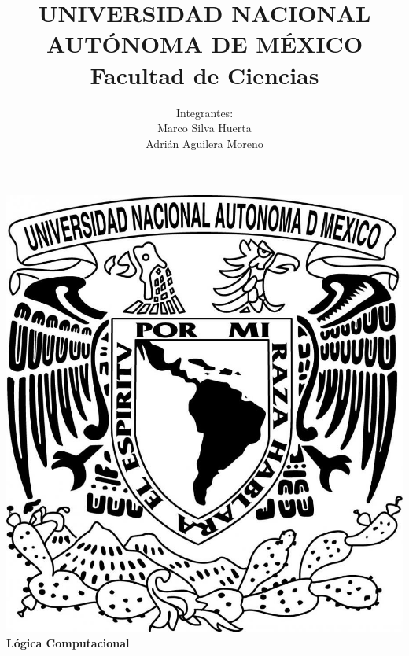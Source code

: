 \documentclass{article}
\begin{document}
\title{UNIVERSIDAD NACIONAL AUT\'ONOMA DE M\'EXICO\\ Facultad de Ciencias}
\author{Integrantes:\\
  Marco Silva Huerta\\
  Adri\'an Aguilera Moreno\\}
\date{}
\maketitle
\begin{center}
  \includegraphics[scale=0.20]{../Imagen/Portada.jpg}\\[0.4cm]
  \Large
  \bf{Lógica Computacional}
  \normalsize
\end{center}
\newpage
{}
\end{document}
